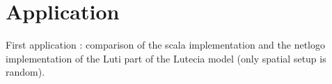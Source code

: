 \section*{Application}

First application : comparison of the scala implementation and the netlogo implementation of the Luti part of the Lutecia model (only spatial setup is random).














